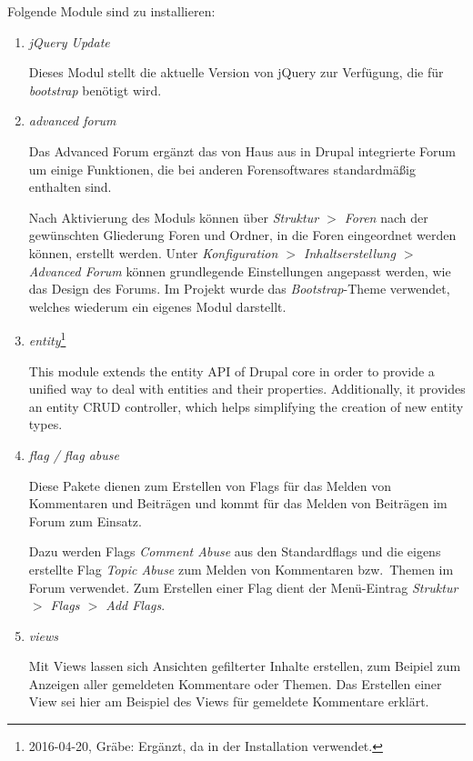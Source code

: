 \documentclass[a4paper,11pt,twoside]{article}
\begin{document}
Folgende Module sind zu installieren: 
\begin{enumerate}

\item \emph{jQuery Update}

Dieses Modul stellt die aktuelle Version von jQuery zur Verfügung, die für
\textit{bootstrap} benötigt wird.

\item \emph{advanced forum}

Das Advanced Forum ergänzt das von Haus aus in Drupal integrierte Forum um
einige Funktionen, die bei anderen Forensoftwares standardmäßig enthalten sind.

Nach Aktivierung des Moduls können über \emph{Struktur $>$ Foren} nach der
gewünschten Gliederung Foren und Ordner, in die Foren eingeordnet werden
können, erstellt werden. Unter \emph{Konfiguration $>$ Inhaltserstellung $>$
  Advanced Forum} können grundlegende Einstellungen angepasst werden, wie das
Design des Forums. Im Projekt wurde das \emph{Bootstrap}-Theme verwendet,
welches wiederum ein eigenes Modul darstellt.

\item \emph{entity}\footnote{2016-04-20, Gräbe: Ergänzt, da in der
  Installation verwendet.}

This module extends the entity API of Drupal core in order to provide a
unified way to deal with entities and their properties. Additionally, it
provides an entity CRUD controller, which helps simplifying the creation of
new entity types.

\item \emph{flag / flag abuse}

Diese Pakete dienen zum Erstellen von Flags für das Melden von Kommentaren und
Beiträgen und kommt für das Melden von Beiträgen im Forum zum Einsatz.

Dazu werden Flags \textit{Comment Abuse} aus den Standardflags und die eigens
erstellte Flag \textit{Topic Abuse} zum Melden von Kommentaren bzw.\ Themen im
Forum verwendet. Zum Erstellen einer Flag dient der Menü-Eintrag
\textit{Struktur $>$ Flags $>$ Add Flags}.

\item \emph{views}

Mit Views lassen sich Ansichten gefilterter Inhalte erstellen, zum Beipiel zum
Anzeigen aller gemeldeten Kommentare oder Themen. Das Erstellen einer View sei
hier am Beispiel des Views für gemeldete Kommentare erklärt.


\end{enumerate}
\end{document}
